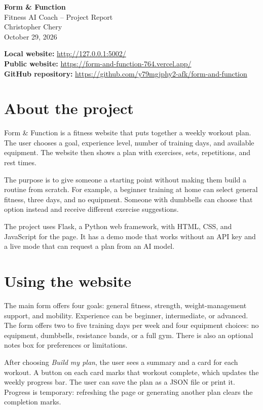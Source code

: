 \documentclass[11pt,letterpaper]{article}
\begin{document}
\begin{center}
{\Large\bfseries Form \& Function}\\[3pt]
{\large Fitness AI Coach -- Project Report}\\[10pt]
Christopher Chery\\
October 29, 2026
\end{center}
\vspace{6pt}
\textbf{Local website:} \url{http://127.0.0.1:5002/}\\
\textbf{Public website:} \url{https://form-and-function-764.vercel.app/}\\
\textbf{GitHub repository:} \url{https://github.com/y79mgjphy2-afk/form-and-function}

\section*{About the project}
Form \& Function is a fitness website that puts together a weekly workout plan. The user chooses a goal, experience level, number of training days, and available equipment. The website then shows a plan with exercises, sets, repetitions, and rest times.

The purpose is to give someone a starting point without making them build a routine from scratch. For example, a beginner training at home can select general fitness, three days, and no equipment. Someone with dumbbells can choose that option instead and receive different exercise suggestions.

The project uses Flask, a Python web framework, with HTML, CSS, and JavaScript for the page. It has a demo mode that works without an API key and a live mode that can request a plan from an AI model.

\section*{Using the website}
The main form offers four goals: general fitness, strength, weight-management support, and mobility. Experience can be beginner, intermediate, or advanced. The form offers two to five training days per week and four equipment choices: no equipment, dumbbells, resistance bands, or a full gym. There is also an optional notes box for preferences or limitations.

After choosing \emph{Build my plan}, the user sees a summary and a card for each workout. A button on each card marks that workout complete, which updates the weekly progress bar. The user can save the plan as a JSON file or print it. Progress is temporary: refreshing the page or generating another plan clears the completion marks.
\end{document}
